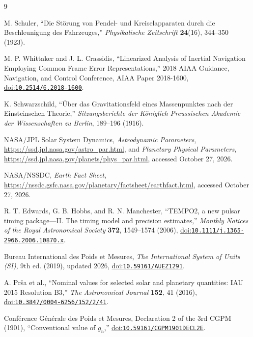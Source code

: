 \documentclass[12pt]{article}
\begin{document}
\begin{thebibliography}{9}
\small
{}
\raggedright
{}

M. Schuler,
``Die St\"orung von Pendel- und Kreiselapparaten durch die Beschleunigung des Fahrzeuges,''
\emph{Physikalische Zeitschrift} \textbf{24}(16), 344--350 (1923).

M. P. Whittaker and J. L. Crassidis,
``Linearized Analysis of Inertial Navigation Employing Common Frame Error Representations,''
2018 AIAA Guidance, Navigation, and Control Conference,
AIAA Paper 2018-1600,
\href{https://doi.org/10.2514/6.2018-1600}{doi:\nolinkurl{10.2514/6.2018-1600}}.

K. Schwarzschild,
``\"Uber das Gravitationsfeld eines Massenpunktes nach der Einsteinschen Theorie,''
\emph{Sitzungsberichte der K\"oniglich Preussischen Akademie der Wissenschaften zu Berlin}, 189--196 (1916).

NASA/JPL Solar System Dynamics,
\emph{Astrodynamic Parameters},
\url{https://ssd.jpl.nasa.gov/astro_par.html}, and
\emph{Planetary Physical Parameters},
\url{https://ssd.jpl.nasa.gov/planets/phys_par.html},
accessed October 27, 2026.

NASA/NSSDC,
\emph{Earth Fact Sheet},
\url{https://nssdc.gsfc.nasa.gov/planetary/factsheet/earthfact.html},
accessed October 27, 2026.

R. T. Edwards, G. B. Hobbs, and R. N. Manchester,
``TEMPO2, a new pulsar timing package---II. The timing model and precision estimates,''
\emph{Monthly Notices of the Royal Astronomical Society} \textbf{372}, 1549--1574 (2006),
\href{https://doi.org/10.1111/j.1365-2966.2006.10870.x}{doi:\nolinkurl{10.1111/j.1365-2966.2006.10870.x}}.

Bureau International des Poids et Mesures,
\emph{The International System of Units (SI)}, 9th ed. (2019), updated 2026,
\href{https://doi.org/10.59161/AUEZ1291}{doi:\nolinkurl{10.59161/AUEZ1291}}.

A. Pr\v{s}a et al.,
``Nominal values for selected solar and planetary quantities: IAU 2015 Resolution B3,''
\emph{The Astronomical Journal} \textbf{152}, 41 (2016),
\href{https://doi.org/10.3847/0004-6256/152/2/41}{doi:\nolinkurl{10.3847/0004-6256/152/2/41}}.

Conf\'erence G\'en\'erale des Poids et Mesures,
Declaration 2 of the 3rd CGPM (1901), ``Conventional value of $g_{\mathrm{n}}$,''
\href{https://doi.org/10.59161/CGPM1901DECL2E}{doi:\nolinkurl{10.59161/CGPM1901DECL2E}}.

\end{thebibliography}
\end{document}
